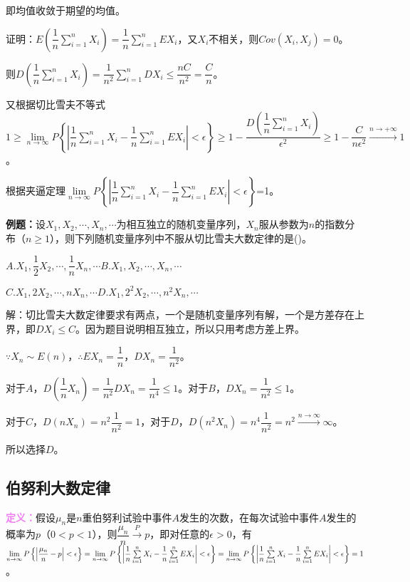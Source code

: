 \documentclass[UTF8, 12pt]{ctexart}
\begin{document}
即均值收敛于期望的均值。

证明：$E\left(\dfrac{1}{n}\sum\limits_{i=1}^nX_i\right)=\dfrac{1}{n}\sum\limits_{i=1}^nEX_i$，又$X_i$不相关，则$Cov(X_i,X_j)=0$。

则$D\left(\dfrac{1}{n}\sum\limits_{i=1}^nX_i\right)=\dfrac{1}{n^2}\sum\limits_{i=1}^nDX_i\leqslant\dfrac{nC}{n^2}=\dfrac{C}{n}$。

又根据切比雪夫不等式$1\geqslant\lim\limits_{n\to\infty}P\left\{\left\vert\dfrac{1}{n}\sum\limits_{i=1}^nX_i-\dfrac{1}{n}\sum\limits_{i=1}^nEX_i\right\vert<\epsilon\right\}\geqslant1-\dfrac{D\left(\dfrac{1}{n}\sum_{i=1}^nX_i\right)}{\epsilon^2}\geqslant1-\dfrac{C}{n\epsilon^2}\xrightarrow{n\to+\infty}1$。

根据夹逼定理$\lim\limits_{n\to\infty}P\left\{\left\vert\dfrac{1}{n}\sum\limits_{i=1}^nX_i-\dfrac{1}{n}\sum\limits_{i=1}^nEX_i\right\vert<\epsilon\right\}$=1。

\textbf{例题：}设$X_1,X_2,\cdots,X_n,\cdots$为相互独立的随机变量序列，$X_n$服从参数为$n$的指数分布（$n\geqslant1$），则下列随机变量序列中不服从切比雪夫大数定律的是()。

$A.X_1,\dfrac{1}{2}X_2,\cdots,\dfrac{1}{n}X_n,\cdots$\qquad$B.X_1,X_2,\cdots,X_n,\cdots$

$C.X_1,2X_2,\cdots,nX_n,\cdots$\qquad$D.X_1,2^2X_2,\cdots,n^2X_n,\cdots$

解：切比雪夫大数定律要求有两点，一个是随机变量序列有解，一个是方差存在上界，即$DX_i\leqslant C$。因为题目说明相互独立，所以只用考虑方差上界。

$\because X_n\sim E(n)$，$\therefore EX_n=\dfrac{1}{n}$，$DX_n=\dfrac{1}{n^2}$。

对于$A$，$D\left(\dfrac{1}{n}X_n\right)=\dfrac{1}{n^2}DX_n=\dfrac{1}{n^4}\leqslant1$。对于$B$，$DX_n=\dfrac{1}{n^2}\leqslant1$。

对于$C$，$D(nX_n)=n^2\dfrac{1}{n^2}=1$，对于$D$，$D(n^2X_n)=n^4\dfrac{1}{n^2}=n^2\overset{n\to\infty}{\longrightarrow}\infty$。

所以选择$D$。

\subsection{伯努利大数定律}

\textcolor{violet}{\textbf{定义：}}假设$\mu_n$是$n$重伯努利试验中事件$A$发生的次数，在每次试验中事件$A$发生的概率为$p$（$0<p<1$），则$\dfrac{\mu_n}{n}\overset{P}{\longrightarrow}p$，即对任意的$\epsilon>0$，有$\lim\limits_{n\to\infty}P\left\{\left\vert\dfrac{\mu_n}{n}-p\right\vert<\epsilon\right\}=\lim\limits_{n\to\infty}P\left\{\left\vert\dfrac{1}{n}\sum\limits_{i=1}^nX_i-\dfrac{1}{n}\sum\limits_{i=1}^nEX_i\right\vert<\epsilon\right\}=\lim\limits_{n\to\infty}P\\\left\{\left\vert\dfrac{1}{n}\sum\limits_{i=1}^nX_i-\dfrac{1}{n}\sum\limits_{i=1}^nEX_i\right\vert<\epsilon\right\}=1$。
\end{document}
